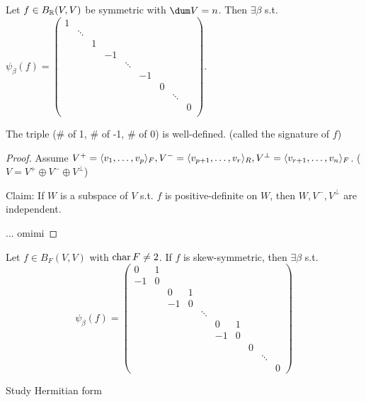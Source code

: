 \begin{theorem}
  Let $f \in B_{\mathbb{R}}(V, V)$ be symmetric with $\dum V = n$. Then $\exists \beta$
  s.t. $\psi_\beta(f) = \begin{pmatrix}
    1 \\
    & \ddots \\
    & & 1 \\
    & & & -1 \\
    & & & & \ddots \\
    & & & & & -1 \\
    & & & & & & 0 \\
    & & & & & & & \ddots \\
    & & & & & & & & 0 \\
  \end{pmatrix}$.

  The triple (\# of 1, \# of -1, \# of 0) is well-defined.
  (called the signature of $f$)
  \begin{proof}


    Assume $V^+ = \langle v_1, \dots, v_p\rangle_F, V^- = \langle v_{p+1}, \dots, v_{r}\rangle_R,
    V^\perp = \langle v_{r+1}, \dots, v_n\rangle_F$. ($V = V^+ \oplus V^- \oplus V^\perp$)

    Claim: If $W$ is a subspace of $V$ s.t. $f$ is positive-definite on $W$,
    then $W, V^-, V^\perp$ are independent.

    ... omimi
  \end{proof}
\end{theorem}

\begin{exercise}
  Let $f \in B_F(V, V)$ with $\operatorname{char} F \ne 2$.
  If $f$ is skew-symmetric, then $\exists \beta$ s.t.
  \[
    \psi_\beta(f) = \begin{pmatrix}
      0 & 1 \\
      -1 & 0 \\
      & & 0 & 1 \\
      & & -1 & 0 \\
      & & & & \ddots \\
      & & & & & 0 & 1 \\
      & & & & & -1 & 0 \\
      & & & & & & & 0 \\
      & & & & & & & & \ddots \\
      & & & & & & & & & 0
    \end{pmatrix}
  \]
\end{exercise}

\begin{exercise}
  Study Hermitian form
\end{exercise}

